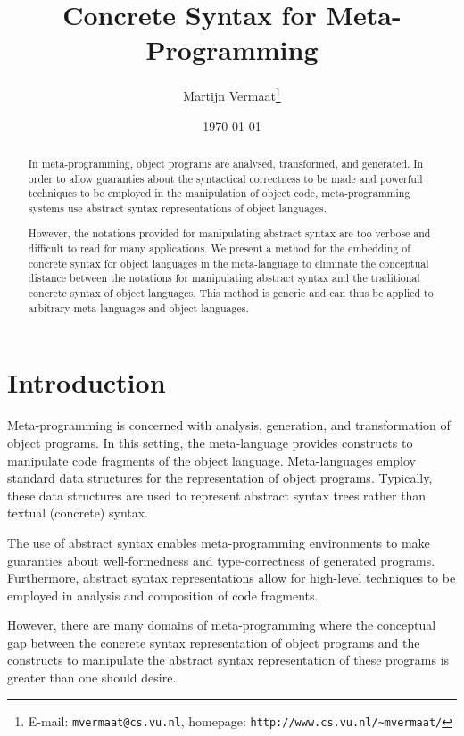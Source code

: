 \documentclass[a4paper,11pt]{article}
\title{Concrete Syntax for Meta-Programming}
\author{Martijn Vermaat\footnote{E-mail: \texttt{mvermaat@cs.vu.nl}, homepage: \texttt{http://www.cs.vu.nl/\~{}mvermaat/}}}
\date{\today}
\begin{document}
\maketitle


\lstset{
  numbers=none,
  basicstyle=\footnotesize\ttfamily,
  frame=tb,
  language=Pascal,
  captionpos=b,
  xleftmargin=1em,
  xrightmargin=1em,
  aboveskip=1em,
  belowskip=1em
}


\begin{abstract}
In meta-programming, object programs are analysed, transformed, and
generated. In order to allow guaranties about the syntactical correctness to be
made and powerfull techniques to be employed in the manipulation of
object code, meta-programming systems use abstract syntax representations
of object languages.

However, the notations provided for manipulating abstract syntax are
too verbose and difficult to read for many applications. We present
a method for the embedding of concrete syntax for object languages in
the meta-language to eliminate the conceptual distance between the
notations for manipulating abstract syntax and the traditional concrete
syntax of object languages. This method is generic and can thus be
applied to arbitrary meta-languages and object languages.
\end{abstract}


\section{Introduction}\label{sec:introduction}

Meta-programming is concerned with analysis, generation, and transformation
of object programs. In this setting, the meta-language provides constructs
to manipulate code fragments of the object language. Meta-languages employ
standard data structures for the representation of object programs. Typically,
these data structures are used to represent abstract syntax trees rather
than textual (concrete) syntax.

The use of abstract syntax enables meta-programming environments to make
guaranties about well-formedness and type-correctness of generated programs.
Furthermore, abstract syntax representations allow for high-level techniques
to be employed in analysis and composition of code fragments.

However, there are many domains of meta-programming where the conceptual gap
between the concrete syntax representation of object programs and the constructs
to manipulate the abstract syntax representation of these programs is greater
than one should desire.
\end{document}
